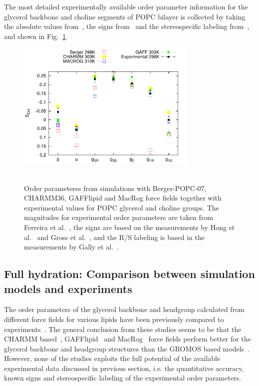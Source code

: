 \documentclass[journal=jacsat,manuscript=article]{achemso}
\begin{document}
The most detailed experimentally available order parameter information for the glycerol backbone and choline 
segments of POPC bilayer is collected by taking the absolute values from~\cite{ferreira13}, the signs from~\cite{hong95a,hong95b,gross97} 
and the stereospecific labeling from~\cite{gally81}, and shown in Fig.~\ref{HGorderparameters2}.
\begin{figure}[]
  \centering
  \includegraphics[width=8.6cm]{../Fig/HGorderparameters5.pdf} \\
   \\
  \caption{\label{HGorderparameters2}
  Order parameteres from simulations with Berger-POPC-07, CHARMM36, GAFFlipid and MacRog force fields together with experimental values for POPC glycerol and choline groups.
  The magnitudes for experimental order parameters are taken from Ferreira et al.~\cite{ferreira13}, the signs are based on the measurements by Hong et al.~\cite{hong95a,hong95b} 
  and Gross et al.~\cite{gross97}, and the R/S labeling is based in the measurements by Gally et al.~\cite{gally81}.
} 
\end{figure}

\subsection{Full hydration: Comparison between simulation models and experiments}

The order parameters of the glycerol backbone and headgroup calculated from different force fields for various lipids have been 
previously compared to experiments~\cite{shinoda97,hogberg08,castro08,klauda10,kapla12,dickson12,poger12,ferreira13,chowdhary13,maciejewski14}. 
The general conclusion from these studies seems to be that the CHARMM based~\cite{hogberg08,klauda10}, GAFFlipid~\cite{dickson12} and
MacRog~\cite{maciejewski14} force fields perform better for the glycerol backbone and headgroup structures than the GROMOS based models~\cite{castro08,kapla12,poger12,ferreira13}.
However, none of the studies exploits the full potential of the available experimental data discussed in previous section, i.e. the quantitative accuracy, known signs and stereospecific labeling of
the experimental order parameters.
\end{document}
